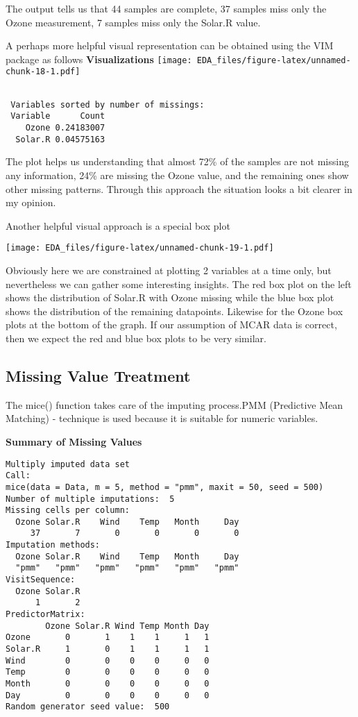 \documentclass[12pt,]{article}
\begin{document}
The output tells us that 44 samples are complete, 37 samples miss only
the Ozone measurement, 7 samples miss only the Solar.R value.

A perhaps more helpful visual representation can be obtained using the
VIM package as follows \textbf{Visualizations}
\texttt{[image: EDA\_files/figure-latex/unnamed-chunk-18-1.pdf]}

\begin{verbatim}

 Variables sorted by number of missings: 
 Variable      Count
    Ozone 0.24183007
  Solar.R 0.04575163
\end{verbatim}

The plot helps us understanding that almost 72\% of the samples are not
missing any information, 24\% are missing the Ozone value, and the
remaining ones show other missing patterns. Through this approach the
situation looks a bit clearer in my opinion.

Another helpful visual approach is a special box plot

\texttt{[image: EDA\_files/figure-latex/unnamed-chunk-19-1.pdf]}

Obviously here we are constrained at plotting 2 variables at a time
only, but nevertheless we can gather some interesting insights. The red
box plot on the left shows the distribution of Solar.R with Ozone
missing while the blue box plot shows the distribution of the remaining
datapoints. Likewise for the Ozone box plots at the bottom of the graph.
If our assumption of MCAR data is correct, then we expect the red and
blue box plots to be very similar.

\subsection{\texorpdfstring{\textbf{Missing Value
Treatment}}{Missing Value Treatment}}\label{missing-value-treatment}

The mice() function takes care of the imputing process.PMM (Predictive
Mean Matching) - technique is used because it is suitable for numeric
variables.

\textbf{Summary of Missing Values}

\begin{verbatim}
Multiply imputed data set
Call:
mice(data = Data, m = 5, method = "pmm", maxit = 50, seed = 500)
Number of multiple imputations:  5
Missing cells per column:
  Ozone Solar.R    Wind    Temp   Month     Day 
     37       7       0       0       0       0 
Imputation methods:
  Ozone Solar.R    Wind    Temp   Month     Day 
  "pmm"   "pmm"   "pmm"   "pmm"   "pmm"   "pmm" 
VisitSequence:
  Ozone Solar.R 
      1       2 
PredictorMatrix:
        Ozone Solar.R Wind Temp Month Day
Ozone       0       1    1    1     1   1
Solar.R     1       0    1    1     1   1
Wind        0       0    0    0     0   0
Temp        0       0    0    0     0   0
Month       0       0    0    0     0   0
Day         0       0    0    0     0   0
Random generator seed value:  500 
\end{verbatim}
\end{document}
